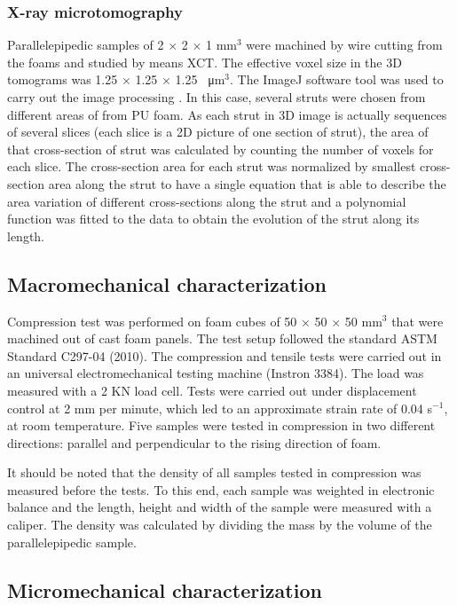 \documentclass[review]{elsarticle}
\begin{document}
\subsubsection{X-ray microtomography}

Parallelepipedic samples of 2 $\times$ 2 $\times$ 1 mm$^3$ were machined by wire cutting from the foams and studied by means XCT. The effective voxel size in the 3D tomograms was 1.25 $\times$ 1.25 $\times$ 1.25 \SI{}{\micro\metre}$^3$. The ImageJ software tool was used to carry out the image processing \citep{ImageJ}. In this case, several struts were chosen from different areas of from PU foam. As each strut in 3D image is actually sequences of several slices (each slice is a 2D picture of one section of strut), the area of that cross-section of strut was calculated by counting the number of voxels for each slice. The cross-section area for each strut was normalized by smallest cross-section area along the strut to have a single equation that is able to describe the area variation of different cross-sections along the strut and a polynomial function was fitted to the data to obtain the evolution of the strut along its length. 

\subsection{Macromechanical characterization}

Compression test was performed on foam cubes of 50 $\times$ 50 $\times$ 50 mm$^3$ that were machined out of cast foam panels. The test setup followed the standard ASTM Standard C297-04 (2010)\citep{ASTMC297}. The compression and tensile tests were carried out in an universal electromechanical testing machine (Instron 3384). The load was measured with a 2 KN load cell.  Tests were carried out under displacement control at 2 mm per minute, which led to an approximate strain rate of 0.04 s$^{-1}$, at room temperature. Five samples were tested in compression in two different directions: parallel and perpendicular to the rising direction of foam.  

It should be noted that the density of all samples tested in compression was measured before the tests. To this end, each sample was weighted in electronic balance and the length, height and width of the sample were measured with a caliper. The density was calculated by dividing the mass by the volume of the parallelepipedic sample.
  
\subsection{Micromechanical characterization}
\end{document}
